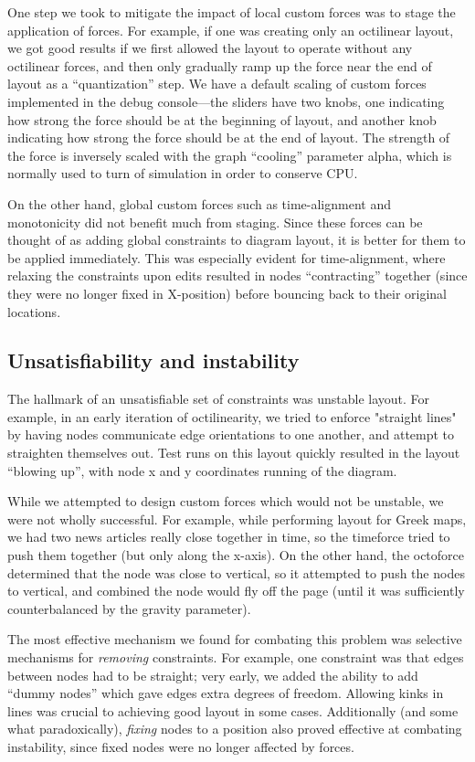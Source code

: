 \documentclass{chi2009}
\begin{document}
One step we took to mitigate the impact of local custom forces was to stage
the application of forces.  For example, if one was creating only an octilinear
layout, we got good results if we first allowed the layout to operate without
any octilinear forces, and then only gradually ramp up the force near the end of
layout as a ``quantization'' step.  We have a default scaling of custom forces
implemented in the debug console---the sliders have two knobs, one indicating
how strong the force should be at the beginning of layout, and another knob indicating
how strong the force should be at the end of layout.  The strength of the force is
inversely scaled with the graph ``cooling'' parameter alpha, which is normally
used to turn of simulation in order to conserve CPU.

On the other hand, global custom forces such as time-alignment and
monotonicity did not benefit much from staging.  Since these forces can
be thought of as adding global constraints to diagram layout, it is
better for them to be applied immediately.  This was especially evident
for time-alignment, where relaxing the constraints upon edits resulted
in nodes ``contracting'' together (since they were no longer fixed in
X-position) before bouncing back to their original locations.

\subsection{Unsatisfiability and instability}

The hallmark of an unsatisfiable set of constraints was unstable layout.
For example, in an early iteration of octilinearity, we tried to enforce
"straight lines" by having nodes communicate edge orientations to one another,
and attempt to straighten themselves out.  Test runs on this layout quickly
resulted in the layout ``blowing up'', with node x and y coordinates running
of the diagram.

While we attempted to design custom forces which would not be unstable,
we were not wholly successful.  For example, while performing layout for
Greek maps, we had two news articles really close together in time, so
the timeforce tried to push them together (but only along the x-axis).
On the other hand, the octoforce determined that the node was close to
vertical, so it attempted to push the nodes to vertical, and combined
the node would fly off the page (until it was sufficiently counterbalanced
by the gravity parameter).

The most effective mechanism we found for combating this problem was
selective mechanisms for \emph{removing} constraints.  For example, one
constraint was that edges between nodes had to be straight; very early,
we added the ability to add ``dummy nodes'' which gave edges extra
degrees of freedom.  Allowing kinks in lines was crucial to achieving
good layout in some cases.  Additionally (and some what paradoxically),
\emph{fixing} nodes to a position also proved effective at combating
instability, since fixed nodes were no longer affected by forces.
\end{document}
